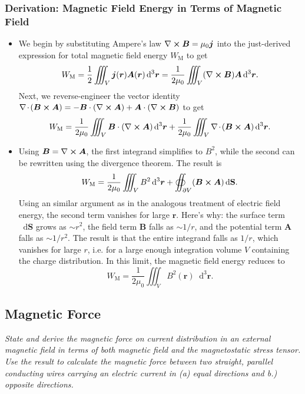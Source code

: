 \documentclass[11pt, a4paper]{article}
\newcommand{\diff}{\mathop{}\!\mathrm{d}} %
\newcommand{\dr}{\diff^{3} \r}  %
\renewcommand{\vec}[1]{\bm{#1}} %
\renewcommand{\r}{\vec{r}}
\newcommand{\B}{\vec{B}} %
\newcommand{\A}{\vec{A}} %
\renewcommand{\S}{\mathbf{S}}  %
\newcommand{\mm}{\mu_{0}}  %
\renewcommand{\j}{\vec{j}}  %
\renewcommand{\div}{\nabla \mspace{-2mu} \cdot \mspace{-2mu}}
\renewcommand{\curl}{\nabla \cross}
\begin{document}
\subsubsection{Derivation: Magnetic Field Energy in Terms of Magnetic Field}
\begin{itemize}
    \item We begin by substituting Ampere's law $ \curl \B = \mm \j $ into the just-derived expression for total magnetic field energy $ W_{\text{M}} $ to get
    \begin{equation*}
        W_{\text{M}} = \frac{1}{2} \iiint_{V} \j(\r) \A(\r) \dr = \frac{1}{2\mm}\iiint_{V}(\curl \B) \A \dr.
    \end{equation*}
    Next, we reverse-engineer the vector identity $ \div (\B \cross \A) = - \B \cdot (\curl \A) + \A \cdot (\curl \B) $ to get
    \begin{equation*}
        W_{\text{M}} = \frac{1}{2\mm} \iiint_{V} \B \cdot (\curl \A)\dr + \frac{1}{2\mm} \iiint_{V} \div (\B \cross \A) \dr.
    \end{equation*}
    \item Using $ \B = \curl \A $, the first integrand simplifies to $ B^{2} $, while the second can be rewritten using the divergence theorem. The result is
    \begin{equation*}
        W_{\text{M}} = \frac{1}{2\mm} \iiint_{V} B^{2} \dr + \oiint_{\partial V} (\B \cross \A) \diff \S.
    \end{equation*}
    Using an similar argument as in the analogous treatment of electric field energy, the second term vanishes for large $ \r $. Here's why: the surface term $ \diff \S $ grows as $ \sim r^{2} $, the field term $ \B $ falls as $ \sim 1/r $, and the potential term $ \A $ falls as $ \sim 1/r^{2} $. The result is that the entire integrand falls as $ 1/r $, which vanishes for large $ r $, i.e. for a large enough integration volume $ V $ containing the charge distribution. In this limit, the magnetic field energy reduces to
    \begin{equation*}
        W_{\text{M}} = \frac{1}{2\mm} \iiint_{V}B^{2}(\r)\dr.
    \end{equation*}
    
\end{itemize}

\subsection{Magnetic Force}
\textit{State and derive the magnetic force on current distribution in an external magnetic field in terms of both magnetic field and the magnetostatic stress tensor. Use the result to calculate the magnetic force between two straight, parallel conducting wires carrying an electric current in (a) equal directions and b.) opposite directions.}
\end{document}
